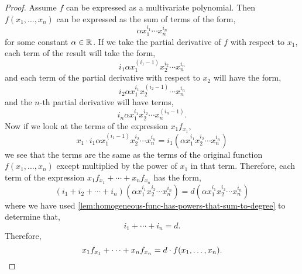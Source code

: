 \documentclass[../MathsNotesBase.tex]{subfiles}
\begin{document}
{		\bigskip
		\begin{proof}
			Assume $f$ can be expressed as a multivariate polynomial. Then $f(x_1, \dots, x_n)$ can be expressed as the sum of terms of the form,
			\[ \alpha x_1^{i_1} \cdots x_n^{i_n} \]
			for some constant ${ \alpha \in \mathbb{R}^{} }$. If we take the partial derivative of $f$ with respect to $x_1$, each term of the result will take the form,
			\[ i_1 \alpha x_1^{(i_1 - 1)}x_2^{i_2}\cdots x_n^{i_n} \]
			and each term of the partial derivative with respect to $x_2$ will have the form,
			\[ i_2 \alpha x_1^{i_1}x_2^{(i_2 - 1)}\cdots x_n^{i_n} \]
			and the $n$-th partial derivative will have terms,
			\[ i_n \alpha x_1^{i_1}x_2^{i_2}\cdots x_n^{(i_n - 1)}. \]
			Now if we look at the terms of the expression $x_1f_{x_1}$,
			\[ x_1 \cdot i_1 \alpha x_1^{(i_1 - 1)}x_2^{i_2}\cdots x_n^{i_n} = i_1 (\alpha x_1^{i_1}x_2^{i_2}\cdots x_n^{i_n}) \]
			we see that the terms are the same as the terms of the original function $f(x_1, \dots, x_n)$ except multiplied by the power of $x_1$ in that term. Therefore, each term of the expression ${ x_1f_{x_1} + \cdots + x_nf_{x_n} }$ has the form,
			\[ (i_1 + i_2 + \cdots + i_n)(\alpha x_1^{i_1}x_2^{i_2}\cdots x_n^{i_n}) = d(\alpha x_1^{i_1}x_2^{i_2}\cdots x_n^{i_n}) \]
			where we have used \autoref{lem:homogeneous-func-has-powers-that-sum-to-degree} to determine that,
			\[ i_1 + \cdots + i_n = d. \]
			Therefore,
			\[ x_1f_{x_1} + \cdots + x_nf_{x_n} = d \cdot f(x_1, \dots, x_n). \qedhere \]
		\end{proof}
	}
\end{document}
